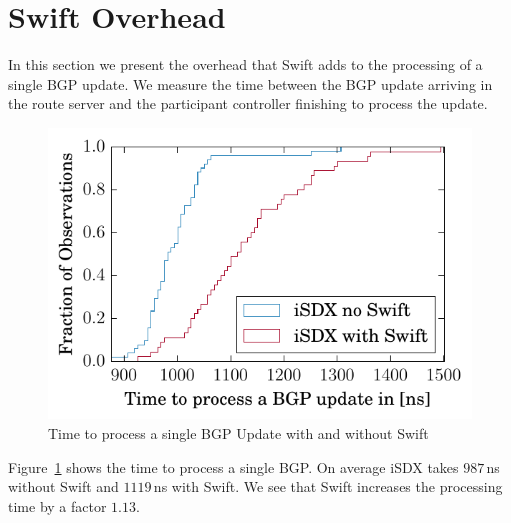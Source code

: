 \section{\label{chapter5:Swift overhead}Swift Overhead}


In this section we present the overhead that Swift adds to the processing of a single BGP update. We measure the time between the BGP update arriving in the route server and the participant controller finishing to process the update. 

\begin{figure}[h]
\center
\includegraphics[scale = 1]{Figures/results_overhead.pdf}
\caption{Time to process a single BGP Update with and without Swift}
\label{fig:swiftoverhead}
\end{figure}

Figure~\ref{fig:swiftoverhead} shows the time to process a single BGP. On average iSDX takes $987$\,ns without Swift and $1119$\,ns with Swift. We see that Swift increases the processing time by a factor $1.13$.

\newpage